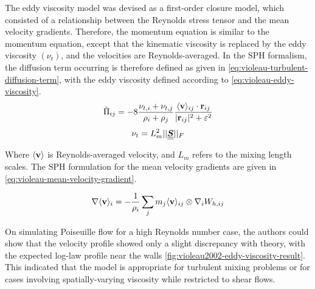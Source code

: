 The eddy viscosity model was devised as a first-order closure model, which consisted of a relationship between the Reynolds stress tensor and the mean velocity gradients. Therefore, the momentum equation is similar to the momentum equation, except that the kinematic viscosity is replaced by the eddy viscosity $(\nu_t)$, and the velocities are Reynolds-averaged. In the SPH formalism, the diffusion term occurring is therefore defined as given in \ref{eq:violeau-turbulent-diffusion-term}, with the eddy viscosity defined according to \ref{eq:violeau-eddy-viscosity}.
\begin{equation}
    \Tilde{\Pi}_{ij} = -8 \frac{\nu_{t, i} + \nu_{t, j}}{\rho_i + \rho_j} \frac{\langle \mathbf{v} \rangle_{ij} \cdot \mathbf{r}_{ij} }{|\mathbf{r}_{ij}|^{2} + \varepsilon^2}
    \label{eq:violeau-turbulent-diffusion-term}
\end{equation}
\begin{equation}
    \nu_t = L_m^2 ||\underline{\underline{\bm{S}}}||_F
    \label{eq:violeau-eddy-viscosity}
\end{equation}

Where $\langle \mathbf{v} \rangle$ is Reynolds-averaged velocity, and $L_m$ refers to the mixing length scales. The SPH formulation for the mean velocity gradients are given in \ref{eq:violeau-mean-velocity-gradient}.

\begin{equation}
    \nabla \langle \mathbf{v} \rangle_i = - \frac{1}{\rho_i} \sum_j m_j \langle \mathbf{v} \rangle_{ij} \otimes \nabla_{i} W_{h, ij}
    \label{eq:violeau-mean-velocity-gradient}
\end{equation}

On simulating Poiseuille flow for a high Reynolds number case, the authors could show that the velocity profile showed only a slight discrepancy with theory, with the expected log-law profile near the walls \ref{fig:violeau2002-eddy-viscosity-result}. This indicated that the model is appropriate for turbulent mixing problems or for cases involving spatially-varying viscosity while restricted to shear flows.

